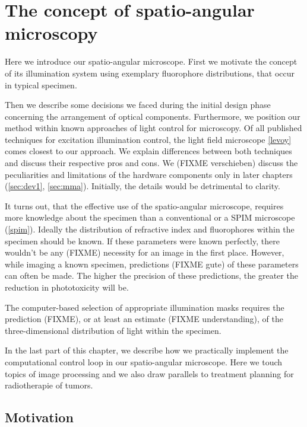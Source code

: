 \chapter{The concept of spatio-angular microscopy}
\label{sec:concept}
\begin{summary}
  Here we introduce our spatio-angular microscope. First we motivate
  the concept of its illumination system using exemplary fluorophore
  distributions, that occur in typical specimen.

  Then we describe some decisions we faced during the initial design
  phase concerning the arrangement of optical components. Furthermore,
  we position our method within known approaches of light control for
  microscopy. Of all published techniques for excitation illumination
  control, the light field microscope \ref{levoy} comes closest to our
  approach.  We explain differences between both techniques and
  discuss their respective pros and cons.  We (FIXME verschieben)
  discuss the peculiarities and limitations of the hardware components
  only in later chapters (\ref{sec:dev1}, \ref{sec:mma}).  Initially,
  the details would be detrimental to clarity.

  It turns out, that the effective use of the spatio-angular
  microscope, requires more knowledge about the specimen than a
  conventional or a SPIM microscope (\ref{spim}). Ideally the
  distribution of refractive index and fluorophores within the
  specimen should be known. If these parameters were known perfectly,
  there wouldn't be any (FIXME) necessity for an image in the first
  place. However, while imaging a known specimen, predictions (FIXME
  gute) of these parameters can often be made. The higher the
  precision of these predictions, the greater the reduction in
  phototoxicity will be.

  The computer-based selection of appropriate illumination masks
  requires the prediction (FIXME), or at least an estimate (FIXME
  understanding), of the three-dimensional distribution of light within
  the specimen.

  In the last part of this chapter, we describe how we practically
  implement the computational control loop in our spatio-angular
  microscope. Here we touch topics of image processing and we also
  draw parallels to treatment planning for radiotherapie of tumors.
\end{summary}
\section{Motivation}

